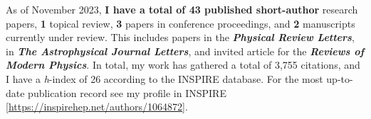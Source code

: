 \documentclass[10pt]{article}
\newcommand{\blankline}{\quad\pagebreak[3]}
\begin{document}
    As of November 2023, \textbf{I have a total of 43 published short-author}
    research papers, \textbf{1} topical review, \textbf{3} papers in conference
    proceedings, and \textbf{2} manuscripts currently under review.
    This includes {} papers in the \textbf{\emph{Physical Review
    Letters}}, {} in \textbf{\emph{The Astrophysical Journal
    Letters}}, and {} invited article for the \textbf{\emph{Reviews
    of Modern Physics}}.
    In total, my work has gathered a total of 3,755 citations, and I have a
    \emph{h}-index of 26 according to the INSPIRE database.
    For the most up-to-date publication record see my profile in INSPIRE
    [\href{https://inspirehep.net/authors/1064872}{https://inspirehep.net/authors/1064872}].

	\blankline
\end{document}
